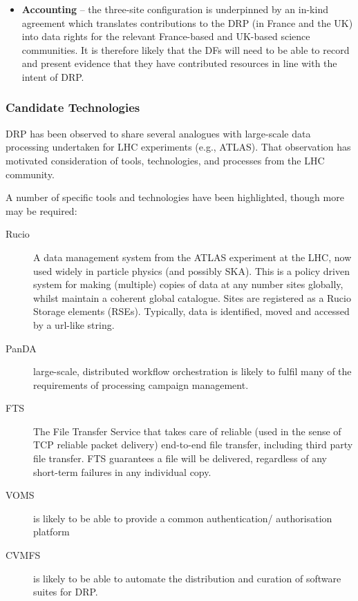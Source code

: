 \begin{itemize}
\item {\bf Accounting} -- the three-site configuration is underpinned by an in-kind agreement which translates contributions to the DRP (in France and the UK) into data rights for the relevant France-based and UK-based science communities. It is therefore likely that the DFs will need to be able to record and present evidence that they have contributed resources in line with the intent of DRP. 

\end{itemize}


\subsubsection{Candidate Technologies}

DRP has been observed to share several analogues with large-scale data processing undertaken for LHC experiments (e.g., ATLAS). That observation has motivated consideration of tools, technologies, and processes from the LHC community. 

A number of specific tools and technologies have been highlighted, though more may be required:

\begin{description}

\item[Rucio] A data management system from the ATLAS experiment at the LHC, now used widely in particle physics (and possibly SKA). This is a policy driven system for making (multiple) copies of data at any number sites globally, whilst maintain a coherent global catalogue. Sites are registered as a Rucio Storage elements (RSEs).  Typically, data is identified, moved and accessed by a url-like string.  

\item[PanDA] large-scale, distributed workflow orchestration is likely to fulfil many of the requirements of processing campaign management. 

\item[FTS]  The File Transfer Service that takes care of reliable (used in the sense of TCP reliable packet delivery) end-to-end file transfer, including third party file transfer. FTS guarantees a file will be delivered, regardless of any short-term failures in any individual copy. 

\item[VOMS] is likely to be able to provide a common authentication/ authorisation platform

\item[CVMFS] is likely to be able to automate the distribution and curation of software suites for DRP.

\end{description}

